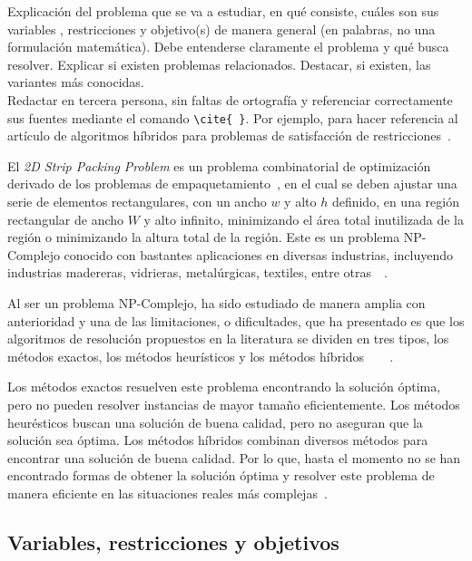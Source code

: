 \documentclass[letter, 10pt]{article}
\begin{document}
Explicaci\'on del problema que se va a estudiar, en qu\'e consiste, cu\'ales son sus variables , restricciones y objetivo(s) de manera general (en palabras, no una formulaci\'on matem\'atica). Debe entenderse claramente el problema y qu\'e busca resolver. Explicar si existen problemas relacionados. Destacar, si existen, las variantes m\'as conocidas.\\
Redactar en tercera persona, sin faltas de ortograf\'ia y referenciar correctamente sus fuentes mediante el comando  \verb+\cite{ }+. Por ejemplo, para hacer referencia al art\'iculo de algoritmos h\'ibridos para problemas de satisfacci\'on de restricciones~\cite{lodi2002two}.
\vspace{0.2cm}

El \emph{2D Strip Packing Problem} es un problema combinatorial de optimizaci\'on derivado de los problemas de empaquetamiento~\cite{oliveira2016survey}, en el cual se deben ajustar una serie de elementos rectangulares, con un ancho $w$ y alto $h$ definido, en una regi\'on rectangular de ancho $W$ y alto infinito, minimizando el \'area total inutilizada de la regi\'on o minimizando la altura total de la regi\'on. Este es un problema NP-Complejo conocido con bastantes aplicaciones en diversas industrias, incluyendo industrias madereras, vidrieras, metal\'urgicas, textiles, entre otras~\cite{lodi2002two}~\cite{vasilyev2023generalized}.

Al ser un problema NP-Complejo, ha sido estudiado de manera amplia con anterioridad y una de las limitaciones, o dificultades, que ha presentado es que los algoritmos de resoluci\'on propuestos en la literatura se dividen en tres tipos, los m\'etodos exactos, los m\'etodos heur\'isticos y los m\'etodos h\'ibridos~\cite{he2013heuristics}~\cite{junior2023framework}~\cite{oliveira2016survey}~\cite{wei2017improved}.

Los m\'etodos exactos resuelven este problema encontrando la soluci\'on \'optima, pero no pueden resolver instancias de mayor tama\~no eficientemente. Los m\'etodos heur\'esticos buscan una soluci\'on de buena calidad, pero no aseguran que la soluci\'on sea \'optima. Los m\'etodos h\'ibridos combinan diversos m\'etodos para encontrar una soluci\'on de buena calidad. Por lo que, hasta el momento no se han encontrado formas de obtener la soluci\'on \'optima y resolver este problema de manera eficiente en las situaciones reales m\'as complejas~\cite{thomas2013hybrid}.

\subsection{Variables, restricciones y objetivos}
\end{document}
